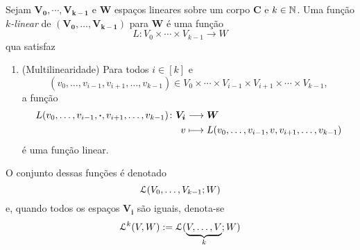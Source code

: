 \begin{definition}
Sejam $\bm{V_0},\cdots,\bm{V_{k-1}}$ e $\bm W$ espaços lineares sobre um corpo $\bm C$ e $k \in \mathbb{N}$. Uma função \emph{$k$-linear} de $(\bm{V_0},\ldots,\bm{V_{k-1}})$ para $\bm W$ é uma função
	\begin{equation*}
	L\colon V_0 \times \cdots \times V_{k-1} \to W
	\end{equation*}
qua satisfaz
	\begin{enumerate}
	\item (Multilinearidade) Para todos $i \in [k]$ e
	\begin{equation*}
	(v_0,\ldots,v_{i-1},v_{i+1},\ldots,v_{k-1}) \in V_0 \times \cdots \times V_{i-1} \times V_{i+1} \times \cdots \times V_{k-1},
	\end{equation*}
a função
	\begin{align*}
	{L(v_0,\ldots,v_{i-1},\bm{\cdot},v_{i+1},\ldots,v_{k-1})}\colon {\bm{V_i}} &\longrightarrow {\bm W} \\{v} &\longmapsto L(v_0,\ldots,v_{i-1},v,v_{i+1},\ldots,v_{k-1})
	\end{align*}
é uma função linear.
	\end{enumerate}
O conjunto dessas funções é denotado
	\begin{equation*}
	\mathcal{L}(V_0,\ldots,V_{k-1};W)
	\end{equation*}
e, quando todos os espaços $\bm{V_i}$ são iguais, denota-se
	\begin{equation*}
	\mathcal{L}^k(V,W) := \mathcal{L}(\underbrace{V,\ldots,V}_k;W)
	\end{equation*}
\end{definition}


